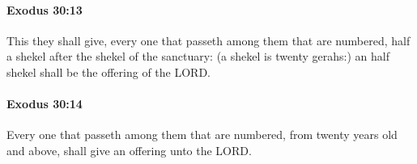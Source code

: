 		\paragraph{Exodus 30:13} %
			\label{EXODUS-30-13}

			This they shall give, every one that passeth among them that are numbered, half a shekel after the shekel of the sanctuary: (a shekel is twenty gerahs:) an half shekel shall be the offering of the LORD.


		\paragraph{Exodus 30:14} %
			\label{EXODUS-30-14}

			Every one that passeth among them that are numbered, from twenty years old and above, shall give an offering unto the LORD.


